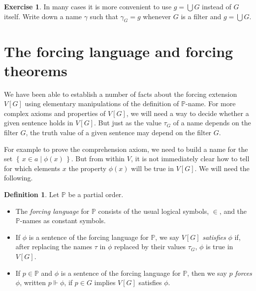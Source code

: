 \documentclass[11pt,oneside,a4paper]{amsbook}
\newcommand{\set}[1]{\left\{\,#1\,\right\}}
\newcommand{\PP}{\mathbb P}
\newcommand{\forces}{\Vdash}
\theoremstyle{definition}
\newtheorem{exercise}{Exercise}[section]
\theoremstyle{plain}
\theoremstyle{definition}
\newtheorem{definition}[theorem]{Definition}
\theoremstyle{remark}
\numberwithin{equation}{section}
\numberwithin{figure}{section}
\begin{document}
\begin{exercise}
  In many cases it is more convenient to use $g=\bigcup G$ instead of $G$ itself. Write down a name $\gamma$ such that $\gamma_G=g$ whenever $G$ is a filter and $g=\bigcup G$.
\end{exercise}



\newpage
\section{The forcing language and forcing theorems}

We have been able to establish a number of facts about the forcing extension $V[G]$ using elementary manipulations of the definition of $\mathbb P$-name. For more complex axioms and properties of $V[G]$, we will need a way to decide whether a given sentence holds in $V[G]$. But just as the value $\tau_G$ of a name depends on the filter $G$, the truth value of a given sentence may depend on the filter $G$.

For example to prove the comprehension axiom, we need to build a name for the set $\set{x\in a\mid\phi(x)}$. But from within $V$, it is not immediately clear how to tell for which elements $x$ the property $\phi(x)$ will be true in $V[G]$. We will need the following.

\begin{definition}
  Let $\PP$ be a partial order.
  \begin{itemize}
  \item The \emph{forcing language} for $\PP$ consists of the usual logical symbols, $\in$, and the $\PP$-names as constant symbols.
  \item If $\phi$ is a sentence of the forcing language for $\PP$, we say $V[G]$ \emph{satisfies} $\phi$ if, after replacing the names $\tau$ in $\phi$ replaced by their values $\tau_G$, $\phi$ is true in $V[G]$.
  \item If $p\in\PP$ and $\phi$ is a sentence of the forcing language for $\PP$, then we say $p$ \emph{forces} $\phi$, written $p\forces\phi$, if $p\in G$ implies $V[G]$ satisfies $\phi$.
  \end{itemize}
\end{definition}
\end{document}
